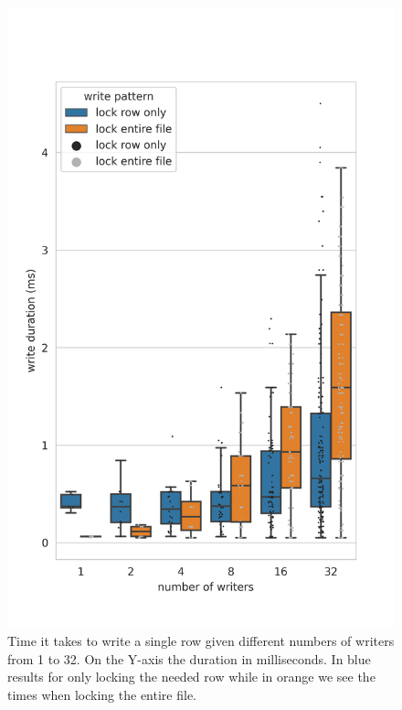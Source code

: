 \begin{figure}[htbp]
	\centering
	\includegraphics[height=\textheight]{../results/plots/single_vs_writers_both.png}
	\caption{Time it takes to write a single row given different numbers of writers from 1 to 32. On the Y-axis the duration in milliseconds. In blue results for only locking the needed row while in orange we see the times when locking the entire file.}
	\label{fig:single_writers}
\end{figure}

\clearpage
